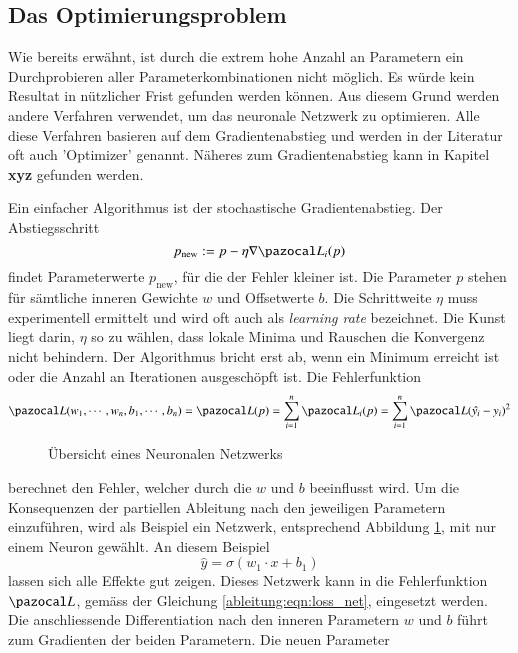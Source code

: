 \subsection{Das Optimierungsproblem}
Wie bereits erwähnt, ist durch die extrem hohe Anzahl an Parametern ein Durchprobieren aller Parameterkombinationen nicht möglich.
Es würde kein Resultat in nützlicher Frist gefunden werden können.
Aus diesem Grund werden andere Verfahren verwendet, um das neuronale Netzwerk zu optimieren.
Alle diese Verfahren basieren auf dem Gradientenabstieg und werden in der Literatur oft auch 'Optimizer' genannt. Näheres zum Gradientenabstieg kann in Kapitel \textbf{xyz} gefunden werden.

Ein einfacher Algorithmus ist der stochastische Gradientenabstieg.
Der Abstiegsschritt 
\begin{equation}
p_{\text{new}}:=p-\eta \nabla \Lb_{i}(p)
\end{equation}
findet Parameterwerte $p_{\text{new}}$, für die der Fehler kleiner ist. Die Parameter $p$ stehen für sämtliche inneren Gewichte $w$ und Offsetwerte $b$. Die Schrittweite $\eta$ muss experimentell ermittelt und wird oft auch als \textit{learning rate} bezeichnet. Die Kunst liegt darin, $\eta$ so zu wählen, dass lokale Minima und Rauschen die Konvergenz nicht behindern. Der Algorithmus bricht erst ab, wenn ein Minimum erreicht ist oder die Anzahl an Iterationen ausgeschöpft ist.
Die Fehlerfunktion
\begin{equation}
\Lb(w_1, \cdots, w_n, b_1, \cdots, b_n) = \Lb(p)=\sum_{i=1}^{n}\Lb_{i}(p)=\sum_{i=1}^{n}\Lb(\hat{y_i}-y_i)^2
\end{equation}
\begin{figure}
	\begin{center}
		
		\caption{Übersicht eines Neuronalen Netzwerks}
		\label{ableitung:fig:single_neuron}
	\end{center}
\end{figure} 
berechnet den Fehler, welcher durch die $w$ und $b$ beeinflusst wird. Um die Konsequenzen der partiellen Ableitung nach den jeweiligen Parametern einzuführen, wird als Beispiel ein Netzwerk, entsprechend Abbildung \ref{ableitung:fig:single_neuron}, mit nur einem Neuron gewählt.
An diesem Beispiel
\begin{equation}
\hat{y} = \sigma \left( w_1 \cdot x + b_1 \right)
\end{equation}
lassen sich alle Effekte gut zeigen.
Dieses Netzwerk kann in die Fehlerfunktion $\Lb$, gemäss der Gleichung \ref{ableitung:eqn:loss_net}, eingesetzt werden. Die anschliessende Differentiation nach den inneren Parametern $w$ und $b$ führt zum Gradienten der beiden Parametern. Die neuen Parameter 
